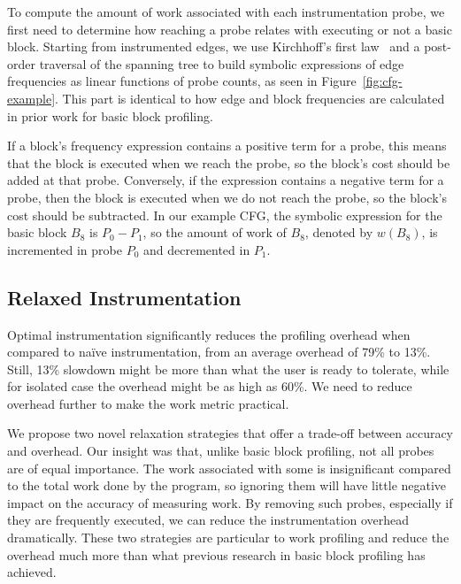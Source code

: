     To compute the amount of work associated with each instrumentation probe, we first need to determine how reaching a probe relates with
    executing or not a basic block. Starting from instrumented edges, we use Kirchhoff's first law~\cite{knuth73,ball94} and a post-order
    traversal of the spanning tree to build symbolic expressions of edge frequencies as linear functions of probe counts, as seen in
    Figure~\ref{fig:cfg-example}. This part is identical to how edge and block frequencies are calculated in prior work for basic block
    profiling.
    
    
    If a block's frequency expression contains a positive term for a probe, this means that the block is executed when we reach the probe,
    so the block's cost should be added at that probe. Conversely, if the expression contains a negative term for a probe, then the block
    is executed when we do not reach the probe, so the block's cost should be subtracted. In our example CFG, the symbolic expression for
    the basic block $B_8$ is $P_0 - P_1$, so the amount of work of $B_8$, denoted by $w(B_8)$, is incremented in probe $P_0$ and
    decremented in $P_1$.


    \subsection{Relaxed Instrumentation}\label{subsec:relaxed}

    Optimal instrumentation significantly reduces the profiling overhead when compared to na\"ive instrumentation, from an average overhead
    of 79\% to 13\%. Still, 13\% slowdown might be more than what the user is ready to tolerate, while for isolated case the overhead might
    be as high as 60\%. We need to reduce overhead further to make the work metric practical. 
    
    We propose two novel relaxation strategies that offer a trade-off between accuracy and overhead. Our insight was that, unlike basic
    block profiling, not all probes are of equal importance. The work associated with some is insignificant compared to the total work
    done by the program, so ignoring them will have little negative impact on the accuracy of measuring work. By removing such probes,
    especially if they are frequently executed, we can reduce the instrumentation overhead dramatically. These two strategies are
    particular to work profiling and reduce the overhead much more than what previous research in basic block profiling has achieved. 

